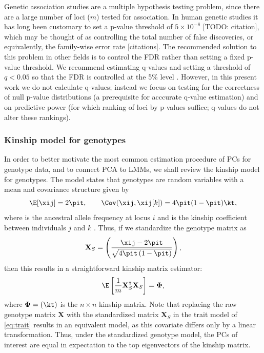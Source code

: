 \documentclass[11pt]{article}
\begin{document}
Genetic association studies are a multiple hypothesis testing problem, since there are a large number of loci ($m$) tested for association.
In human genetic studies it has long been customary to set a p-value threshold of $5 \times 10^{-8}$ [TODO: citation], which may be thought of as controlling the total number of false discoveries, or equivalently, the family-wise error rate [citations].
The recommended solution to this problem in other fields is to control the FDR rather than setting a fixed p-value threshold.
We recommend estimating q-values and setting a threshold of $q < 0.05$ so that the FDR is controlled at the 5\% level \citep{storey_positive_2003, storey_statistical_2003}.
However, in this present work we do not calculate q-values; instead we focus on testing for the correctness of null p-value distributions (a prerequisite for acccurate q-value estimation) and on predictive power (for which ranking of loci by p-values suffice; q-values do not alter these rankings).

\subsubsection{Kinship model for genotypes}

In order to better motivate the most common estimation procedure of PCs for genotype data, and to connect PCA to LMMs, we shall review the kinship model for genotypes.
The model states that genotypes are random variables with a mean and covariance structure given by
$$
\E[ \xij ]
=
2 \pit,
\quad\quad
\Cov( \xij, \xij[k] )
=
4 \pit ( 1 - \pit ) \kt,
$$
where \pit is the ancestral allele frequency at locus $i$ and \kt is the kinship coefficient between individuals $j$ and $k$ \citep{malecot_mathematiques_1948, wright_genetical_1951, jacquard_structures_1970}.
Thus, if we standardize the genotype matrix as
$$
\mathbf{X}_S
=
\left(
  \frac{
    \xij - 2 \pit
  }{
    \sqrt{4 \pit \left( 1 - \pit \right)}
  }
\right)
,
$$
then this results in a straightforward kinship matrix estimator:
$$
\E
\left[
\frac{1}{m}
\mathbf{X}_S^\intercal
\mathbf{X}_S
\right]
=
\mathbf{\Phi}
,
$$
where $\mathbf{\Phi} = ( \kt )$ is the $n \times n$ kinship matrix.
Note that replacing the raw genotype matrix $\mathbf{X}$ with the standardized matrix $\mathbf{X}_S$ in the trait model of \cref{eq:trait} results in an equivalent model, as this covariate differs only by a linear transformation.
Thus, under the standardized genotype model, the PCs of interest are equal in expectation to the top eigenvectors of the kinship matrix.
\end{document}
